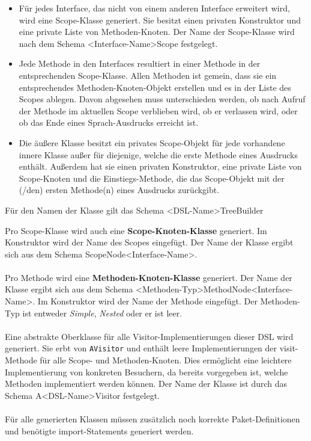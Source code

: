 \begin{itemize}
	\item Für jedes Interface, das nicht von einem anderen Interface erweitert wird, wird eine Scope-Klasse generiert. Sie besitzt einen privaten Konstruktor und eine private Liste von Methoden-Knoten. Der Name der Scope-Klasse wird nach dem Schema <Interface-Name>Scope festgelegt.
	\item Jede Methode in den Interfaces resultiert in einer Methode in der entsprechenden Scope-Klasse. Allen Methoden ist gemein, dass sie ein entsprechendes Methoden-Knoten-Objekt erstellen und es in der Liste des Scopes ablegen. Davon abgesehen muss unterschieden werden, ob nach Aufruf der Methode im aktuellen Scope verblieben wird, ob er verlassen wird, oder ob das Ende eines Sprach-Ausdrucks erreicht ist.
	\item Die äußere Klasse besitzt ein privates Scope-Objekt für jede vorhandene innere Klasse außer für diejenige, welche die erste Methode eines Ausdrucks enthält. Außerdem hat sie einen privaten Konstruktor, eine private Liste von Scope-Knoten und die Einstiegs-Methode, die das Scope-Objekt mit der (/den) ersten Methode(n) eines Ausdrucks zurückgibt.
\end{itemize}

Für den Namen der Klasse gilt das Schema <DSL-Name>TreeBuilder

\noindent
Pro Scope-Klasse wird auch eine \textbf{Scope-Knoten-Klasse} generiert. Im Konstruktor wird der Name des Scopes eingefügt. Der Name der Klasse ergibt sich aus dem Schema ScopeNode<Interface-Name>.
\\ \\
\noindent
Pro Methode wird eine \textbf{Methoden-Knoten-Klasse} generiert.
Der Name der Klasse ergibt sich aus dem Schema <Methoden-Typ>MethodNode<Interface-Name>. Im Konstruktor wird der Name der Methode eingefügt. Der Methoden-Typ ist entweder \emph{Simple}, \emph{Nested} oder er ist leer.
\\ \\
\noindent
Eine abstrakte Oberklasse für alle Visitor-Implementierungen dieser DSL wird generiert. Sie erbt von \texttt{AVisitor} und enthält leere Implementierungen der visit-Methode für alle Scope- und Methoden-Knoten. Dies ermöglicht eine leichtere Implementierung von konkreten Besuchern, da bereits vorgegeben ist, welche Methoden implementiert werden können. Der Name der Klasse ist durch das Schema A<DSL-Name>Visitor festgelegt.
\\ \\
Für alle generierten Klassen müssen zusätzlich noch korrekte Paket-Definitionen und benötigte import-Statements generiert werden.

